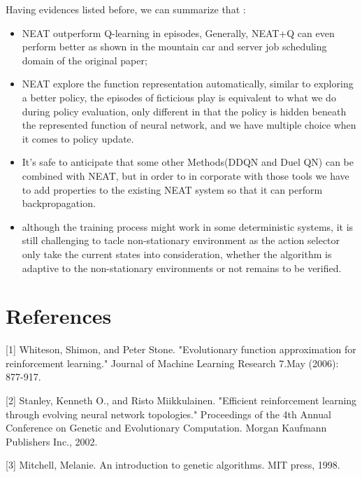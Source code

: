\documentclass{article}
\begin{document}
Having evidences listed before, we can summarize that :
\begin{itemize}
  \item NEAT outperform Q-learning in episodes, Generally, NEAT+Q can even perform better as shown in the mountain car and server job scheduling domain of the original paper; 
  \item NEAT explore the function representation automatically, similar to exploring a better policy, the episodes of ficticious play is equivalent to what we do during policy evaluation,
  only different in that the policy is hidden beneath the represented function of neural network, and we have multiple choice when it comes to policy update.
  \item It's safe to anticipate that some other Methods(DDQN and Duel QN) can be combined with NEAT, but in order to in corporate with those tools we have to add properties to the existing NEAT system
  so that it can perform backpropagation.
  \item  although the training process might work in some deterministic systems, it is still challenging to tacle non-stationary environment as the action selector only take 
  the current states into consideration, whether the algorithm is adaptive to the non-stationary environments or not remains to be verified.
\end{itemize}


\section*{References}

\small

[1] Whiteson, Shimon, and Peter Stone. "Evolutionary function approximation for reinforcement learning." Journal of Machine Learning Research 7.May (2006): 877-917.

[2] Stanley, Kenneth O., and Risto Miikkulainen. "Efficient reinforcement learning through evolving neural network topologies." Proceedings of the 4th Annual Conference on Genetic and Evolutionary Computation. Morgan Kaufmann Publishers Inc., 2002.

[3] Mitchell, Melanie. An introduction to genetic algorithms. MIT press, 1998.
\end{document}
